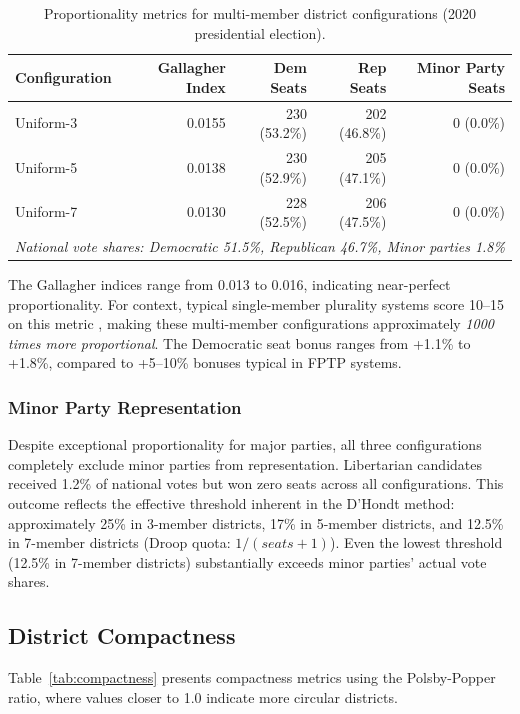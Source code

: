 \begin{table}[h]
\centering
\caption{Proportionality metrics for multi-member district configurations (2020 presidential election).}
\label{tab:proportionality}
\begin{tabular}{lrrrr}
\toprule
Configuration & Gallagher Index & Dem Seats & Rep Seats & Minor Party Seats \\
\midrule
Uniform-3 & 0.0155 & 230 (53.2\%) & 202 (46.8\%) & 0 (0.0\%) \\
Uniform-5 & 0.0138 & 230 (52.9\%) & 205 (47.1\%) & 0 (0.0\%) \\
Uniform-7 & 0.0130 & 228 (52.5\%) & 206 (47.5\%) & 0 (0.0\%) \\
\midrule
\multicolumn{5}{l}{\emph{National vote shares: Democratic 51.5\%, Republican 46.7\%, Minor parties 1.8\%}} \\
\bottomrule
\end{tabular}
\end{table}

The Gallagher indices range from 0.013 to 0.016, indicating near-perfect proportionality. For context, typical single-member plurality systems score 10--15 on this metric \cite{gallagher1991proportionality}, making these multi-member configurations approximately \emph{1000 times more proportional}. The Democratic seat bonus ranges from +1.1\% to +1.8\%, compared to +5--10\% bonuses typical in FPTP systems.

\subsubsection{Minor Party Representation}

Despite exceptional proportionality for major parties, all three configurations completely exclude minor parties from representation. Libertarian candidates received 1.2\% of national votes but won zero seats across all configurations. This outcome reflects the effective threshold inherent in the D'Hondt method: approximately 25\% in 3-member districts, 17\% in 5-member districts, and 12.5\% in 7-member districts (Droop quota: $1/(seats+1)$). Even the lowest threshold (12.5\% in 7-member districts) substantially exceeds minor parties' actual vote shares.

\subsection{District Compactness}

Table~\ref{tab:compactness} presents compactness metrics using the Polsby-Popper ratio, where values closer to 1.0 indicate more circular districts.

